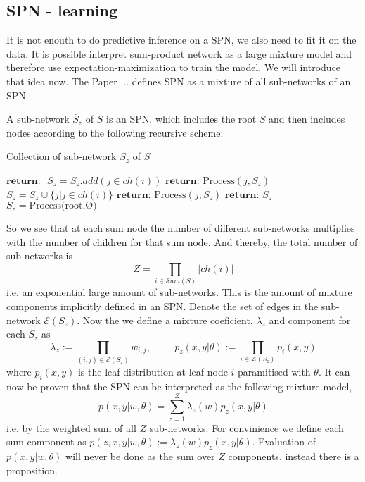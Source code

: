 \subsection{SPN - learning}
It is not enouth to do predictive inference on a SPN, we also need to fit it on
the data. It is possible interpret sum-product network as a large mixture model 
and therefore use expectation-maximization to train the model. 
We will introduce that idea now. The Paper \cite{SPN_EM}... %
defines SPN as a mixture of all sub-networks of an SPN.

\begin{definition} 
    A sub-network $\bar S_z$ of $S$ is an SPN, which includes the root $S$ and then includes nodes
    according to the following recursive scheme: 
\end{definition}
\begin{algorithm}[H]
    \caption*{Collection of sub-network $S_z$ of $S$}\label{SPN3}
    \begin{algorithmic}
        \State  $\textbf{return: }$ 
    \EndIf
        \State $S_z =S_z.add(j \in ch(i))$ 
        \State $\textbf{return: } \text{Process}(j, S_z)$
    \EndIf
        \State $S_z =S_z \cup \{j | j \in ch(i)\}$ 
            \State $\textbf{return: } \text{Process}(j,S_z)$
        \EndFor
    \EndIf
    \State $\textbf{return: } S_z$
    \EndFunction
    \State $S_z =  \text{Process(root,Ø)}$
    \end{algorithmic}
\end{algorithm}
So we see that at each sum node the number of different sub-networks multiplies with the number of children for that
sum node. And thereby, the total number of sub-networks is
 $$Z = \prod_{i\in \mathcal{S}um(S)}|ch(i)|$$ 
 i.e. an exponential large amount of sub-networks. This is the amount of
 mixture components implicitly defined in an SPN. 
 Denote the set of edges in the sub-network $\mathcal{E}(S_z)$.
Now the we define a mixture coeficient, $\lambda_z$ and component for each $S_z$ as 
$$\lambda_z := \prod_{(i,j)\in \mathcal{E}(S_z)} w_{i,j}, \hspace{1cm}
p_z(x,y|\theta) := \prod_{i \in \mathcal{L}(S_z)} p_i(x,y)$$
where $p_i(x,y)$ is the leaf distribution at leaf node $i$ paramitised with $\theta$. 
It can now be proven that the SPN can be interpreted as the following mixture model, 
$$p(x,y|w,\theta) = \sum_{z=1}^Z \lambda_z(w)p_z(x,y|\theta)$$
i.e. by the weighted sum of all $Z$ sub-networks. For convinience
we define each sum component as $p(z,x,y|w,\theta) := \lambda_z(w)p_z(x,y|\theta)$.
Evaluation of $p(x,y|w,\theta)$ will never be done as the sum over $Z$ components, 
instead there is a proposition. 

